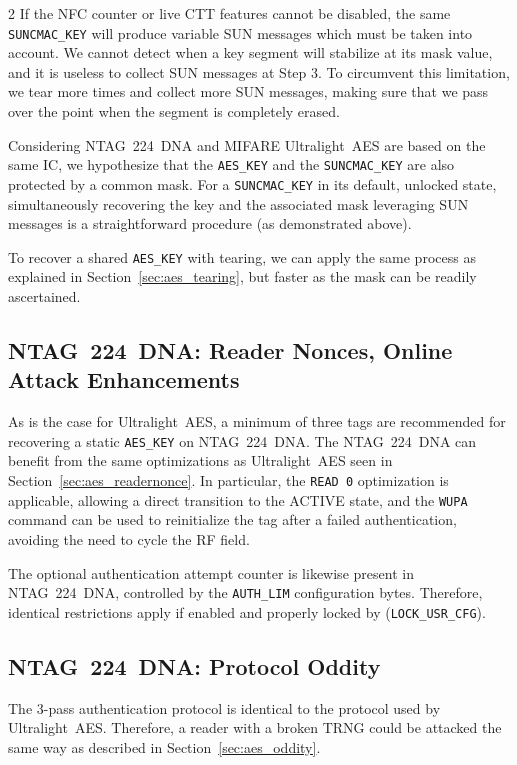 \documentclass[10pt,letterpaper]{article}
\begin{document}
\begin{multicols}{2}
If the NFC counter or live CTT features cannot be disabled, the same \texttt{SUNCMAC\_KEY} will produce variable SUN messages which must be taken into account. We cannot detect when a key segment will stabilize at its mask value, and it is useless to collect SUN messages at Step 3. To circumvent this limitation, we tear more times and collect more SUN messages, making sure that we pass over the point when the segment is completely erased.

Considering NTAG~224~DNA and MIFARE Ultralight~AES are based on the same IC, we hypothesize that the \texttt{AES\_KEY} and the \texttt{SUNCMAC\_KEY} are also protected by a common mask. For a \texttt{SUNCMAC\_KEY} in its default, unlocked state, simultaneously recovering the key and the associated mask leveraging SUN messages is a straightforward procedure (as demonstrated above).

To recover a shared \texttt{AES\_KEY} with tearing, we can apply the same process as explained in Section~\ref{sec:aes_tearing}, but faster as the mask can be readily ascertained.

\subsection{NTAG~224~DNA: Reader Nonces, Online Attack Enhancements}
As is the case for Ultralight~AES, a minimum of three tags are recommended for recovering a static \texttt{AES\_KEY} on NTAG~224~DNA.
The NTAG~224~DNA can benefit from the same optimizations as Ultralight~AES seen in Section~\ref{sec:aes_readernonce}. In particular, the \texttt{READ~0} optimization is applicable, allowing a direct transition to the ACTIVE state, and the \texttt{WUPA} command can be used to reinitialize the tag after a failed authentication, avoiding the need to cycle the RF field.

The optional authentication attempt counter is likewise present in NTAG~224~DNA, controlled by the \texttt{AUTH\_LIM} configuration bytes. Therefore, identical restrictions apply if enabled and properly locked by (\texttt{LOCK\_USR\_CFG}).

\subsection{NTAG~224~DNA: Protocol Oddity}
The 3-pass authentication protocol is identical to the protocol used by Ultralight~AES.
Therefore, a reader with a broken TRNG could be attacked the same way as described in Section~\ref{sec:aes_oddity}.


\end{multicols}
\end{document}
